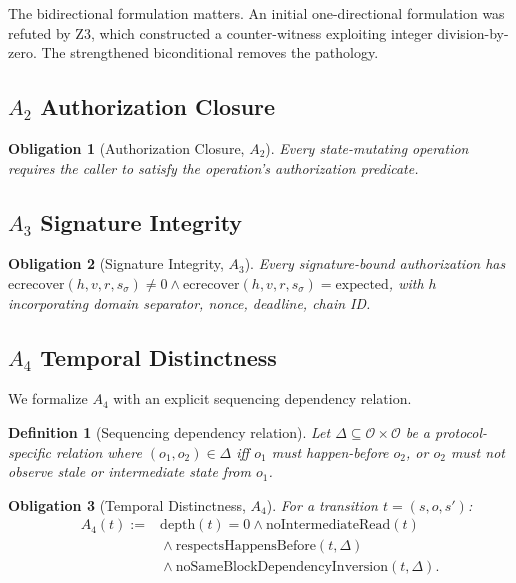 \documentclass[11pt,a4paper]{article}
\newtheorem{definition}[theorem]{Definition}
\newtheorem{obligation}{Obligation}
\begin{document}
The bidirectional formulation matters. An initial one-directional formulation was refuted by Z3, which constructed a counter-witness exploiting integer division-by-zero. The strengthened biconditional removes the pathology.

\subsection{$A_2$ Authorization Closure}

\begin{obligation}[Authorization Closure, $A_2$]
Every state-mutating operation requires the caller to satisfy the operation's authorization predicate.
\end{obligation}

\subsection{$A_3$ Signature Integrity}

\begin{obligation}[Signature Integrity, $A_3$]
Every signature-bound authorization has $\mathrm{ecrecover}(h, v, r, s_\sigma) \neq 0 \wedge \mathrm{ecrecover}(h, v, r, s_\sigma) = \text{expected}$, with $h$ incorporating domain separator, nonce, deadline, chain ID.
\end{obligation}

\subsection{$A_4$ Temporal Distinctness}

We formalize $A_4$ with an explicit sequencing dependency relation.

\begin{definition}[Sequencing dependency relation]
Let $\Delta \subseteq \mathcal{O} \times \mathcal{O}$ be a protocol-specific relation where $(o_1, o_2) \in \Delta$ iff $o_1$ must happen-before $o_2$, or $o_2$ must not observe stale or intermediate state from $o_1$.
\end{definition}

\begin{obligation}[Temporal Distinctness, $A_4$]\label{ob:a4}
For a transition $t = (s, o, s')$:
\[
\begin{aligned}
A_4(t) :={} & \mathrm{depth}(t) = 0 \wedge \mathrm{noIntermediateRead}(t) \\
            & {} \wedge \mathrm{respectsHappensBefore}(t, \Delta) \\
            & {} \wedge \mathrm{noSameBlockDependencyInversion}(t, \Delta).
\end{aligned}
\]
\end{obligation}
\end{document}
